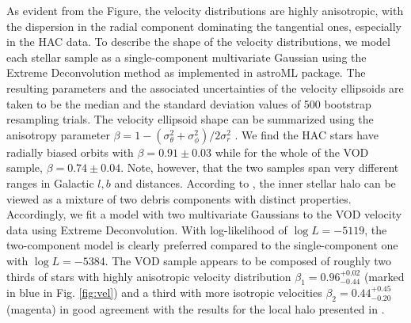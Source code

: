 \documentclass[a4paper,useAMS,usenatbib]{mnras}
\begin{document}
As evident from the Figure, the velocity distributions are highly
anisotropic, with the dispersion in the radial component dominating
the tangential ones, especially in the HAC data. To describe the shape
of the velocity distributions, we model each stellar sample as a
single-component multivariate Gaussian using the Extreme
Deconvolution \citep{ED} method as implemented in $\mathrm{astroML}$
\citep{astroML} package. The resulting parameters and the associated
uncertainties of the velocity ellipsoids are taken to be the median
and the standard deviation values of 500 bootstrap resampling trials.
The velocity ellipsoid shape can be summarized using the anisotropy
parameter $\beta=1-(\sigma^2_{\theta}+\sigma^2_{\phi})/2\sigma^2_r$
\citep[see][]{Binney2008}. We find the HAC stars have radially biased
orbits with $\beta = 0.91 \pm 0.03$ while for the whole of the VOD
sample, $\beta = 0.74 \pm 0.04$. Note, however, that the two samples
span very different ranges in Galactic $l,b$ and distances. According
to \citet{Belokurov2018}, the inner stellar halo can be viewed as a
mixture of two debris components with distinct
properties. Accordingly, we fit a model with two multivariate
Gaussians to the VOD velocity data using Extreme Deconvolution. 
With log-likelihood of $\log L = -5119$, the
two-component model is clearly preferred compared to the
single-component one with $\log L = -5384$. The VOD sample appears to
be composed of roughly two thirds of stars with highly anisotropic
velocity distribution $\beta_{1}=
0.96^{+0.02}_{-0.44}$ (marked in blue in Fig. \ref{fig:vel}) and a
third with more isotropic velocities $\beta_{2}=0.44^{+0.45}_{-0.20}$ (magenta) in good
agreement with the results for the local halo presented in
\citet{Belokurov2018}.
%
\end{document}
